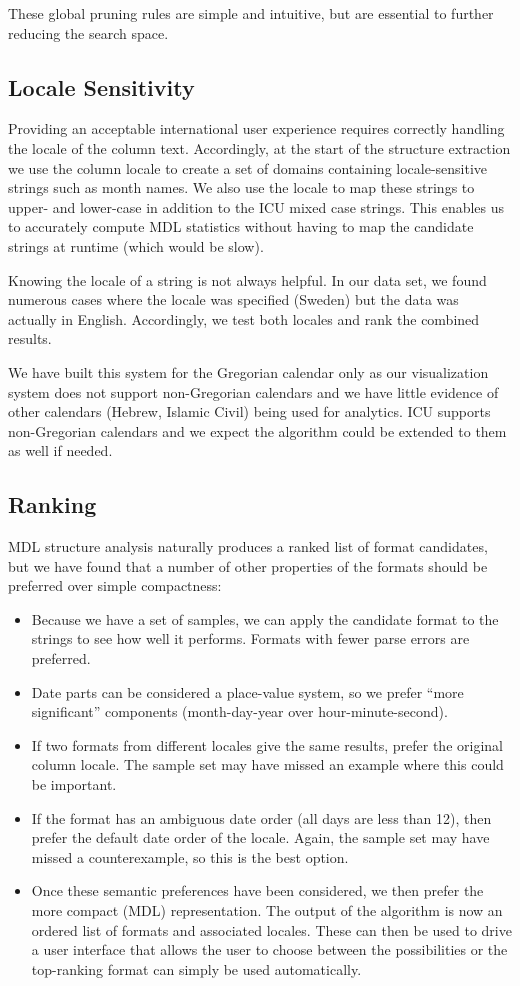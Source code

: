 These global pruning rules are simple and intuitive, but are essential to further reducing the search space.

\subsection{Locale Sensitivity}
Providing an acceptable international user experience requires correctly handling the locale of the column text. Accordingly, at the start of the structure extraction we use the column locale to create a set of domains containing locale-sensitive strings such as month names. We also use the locale to map these strings to upper- and lower-case in addition to the ICU mixed case strings. This enables us to accurately compute MDL statistics without having to map the candidate strings at runtime (which would be slow).

Knowing the locale of a string is not always helpful. In our data set, we found numerous cases where the locale was specified (\eg Sweden) but the data was actually in English. Accordingly, we test both locales and rank the combined results. 

We have built this system for the Gregorian calendar only as our visualization system does not support non-Gregorian calendars and we have little evidence of other calendars (\eg Hebrew, Islamic Civil) being used for analytics. ICU supports non-Gregorian calendars and we expect the algorithm could be extended to them as well if needed.

\subsection{Ranking}
MDL structure analysis naturally produces a ranked list of format candidates, but we have found that a number of other properties of the formats should be preferred over simple compactness:
\begin{itemize}
\item Because we have a set of samples, we can apply the candidate format to the strings to see how well it performs. Formats with fewer parse errors are preferred.
\item Date parts can be considered a place-value system, so we prefer ``more significant'' components (\eg month-day-year over hour-minute-second).
\item If two formats from different locales give the same results, prefer the original column locale. The sample set may have missed an example where this could be important.
\item If the format has an ambiguous date order (\eg all days are less than 12), then prefer the default date order of the locale. Again, the sample set may have missed a counterexample, so this is the best option.
\item Once these semantic preferences have been considered, we then prefer the more compact (MDL) representation.
The output of the algorithm is now an ordered list of formats and associated locales. These can then be used to drive a user interface that allows the user to choose between the possibilities or the top-ranking format can simply be used automatically.
\end{itemize}